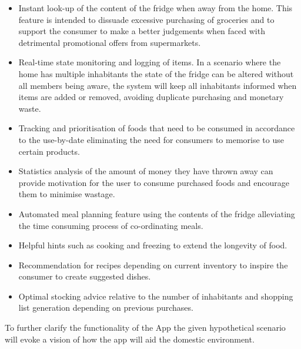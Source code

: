 \documentclass[a4paper, 11pt]{article}
\begin{document}
\begin{itemize}
  \item Instant look-up of the content of the fridge when away from the home. This feature is intended to dissuade excessive purchasing of groceries and to support the consumer to make a better judgements when faced with detrimental promotional offers from supermarkets.
  
  \item Real-time state monitoring and logging of items. In a scenario where the home has multiple inhabitants the state of the fridge can be altered without all members being aware, the system will keep all inhabitants informed when items are added or removed, avoiding duplicate purchasing and monetary waste.
  
  \item Tracking and prioritisation of foods that need to be consumed in accordance to the use-by-date eliminating the need for consumers to memorise to use certain products. 
  
  \item Statistics analysis of the amount of money they have thrown away can provide motivation for the user to consume purchased foods and encourage them to minimise wastage.
   
   \item Automated meal planning feature using the contents of the fridge alleviating the time consuming process of co-ordinating meals. 
    
   \item Helpful hints such as cooking and freezing to extend the longevity of food. 
   
   \item Recommendation for recipes depending on current inventory to inspire the consumer to create suggested dishes. 

   \item Optimal stocking advice relative to the number of inhabitants and shopping list generation depending on previous purchases. 
 \end{itemize}

To further clarify the functionality of the App the given hypothetical scenario will evoke a vision of how the app will aid the domestic environment. 
\end{document}

